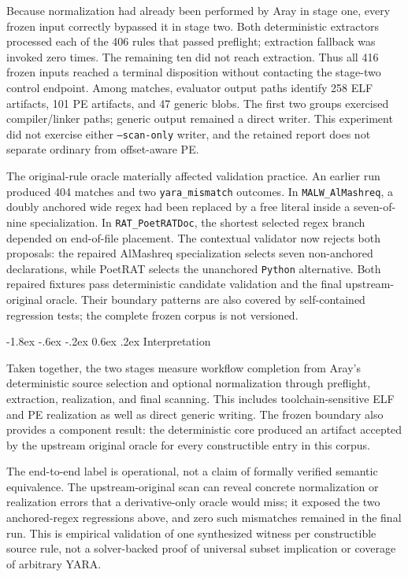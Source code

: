 \documentclass[11pt,twocolumn]{article}
\makeatletter
\newcommand{\code}[1]{\texttt{#1}}
\renewcommand\subsection{\@startsection{subsection}{2}{\z@}%
  {-1.8ex \@plus -.6ex \@minus -.2ex}%
  {0.6ex \@plus .2ex}%
  {\normalfont\normalsize\bfseries}}
\makeatother
\begin{document}
Because normalization had already been performed by Aray in stage one, every
frozen input correctly bypassed it in stage two. Both deterministic extractors
processed each of the 406 rules that passed preflight; extraction fallback was
invoked zero times. The remaining ten did not reach extraction. Thus all 416
frozen inputs reached a terminal disposition without contacting the stage-two
control endpoint. Among matches, evaluator output paths identify 258 ELF
artifacts, 101 PE artifacts, and 47 generic blobs. The first two groups exercised
compiler/linker paths; generic output remained a direct writer. This experiment
did not exercise either \code{--scan-only} writer, and the retained report does
not separate ordinary from offset-aware PE.

The original-rule oracle materially affected validation practice. An earlier
run produced 404 matches and two \code{yara\_mismatch} outcomes. In
\code{MALW\_AlMashreq}, a doubly anchored wide regex had been replaced by a free
literal inside a seven-of-nine specialization. In \code{RAT\_PoetRATDoc}, the
shortest selected regex branch depended on end-of-file placement. The contextual
validator now rejects both proposals: the repaired AlMashreq specialization
selects seven non-anchored declarations, while PoetRAT selects the unanchored
\code{Python} alternative. Both repaired fixtures pass deterministic candidate
validation and the final upstream-original oracle. Their boundary patterns are
also covered by self-contained regression tests; the complete frozen corpus is
not versioned.

\subsection{Interpretation}

Taken together, the two stages measure workflow completion from Aray's
deterministic source selection and optional normalization through preflight,
extraction, realization, and final scanning. This includes toolchain-sensitive
ELF and PE realization as well as direct generic writing. The frozen boundary
also provides a component result: the deterministic core produced an artifact
accepted by the upstream original oracle for every constructible entry in this
corpus.

The end-to-end label is operational, not a claim of formally verified semantic
equivalence. The upstream-original scan can reveal concrete normalization or
realization errors that a derivative-only oracle would miss; it exposed the two
anchored-regex regressions above, and zero such mismatches remained in the final
run. This is empirical validation of one synthesized witness per constructible
source rule, not a solver-backed proof of universal subset implication or
coverage of arbitrary YARA.
\end{document}
